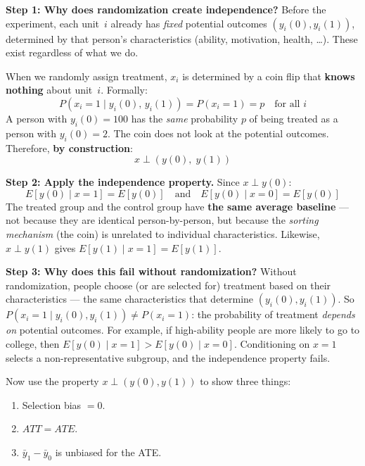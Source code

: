 \documentclass[11pt,a4paper]{article}
\begin{document}
\begin{enumerate}[label=(\alph*)]
\begin{bookexample}
\smallskip
\textbf{Step 1: Why does randomization create independence?} Before the experiment, each unit~$i$ already has \emph{fixed} potential outcomes $(y_i(0), y_i(1))$, determined by that person's characteristics (ability, motivation, health, \dots). These exist regardless of what we do.

When we randomly assign treatment, $x_i$ is determined by a coin flip that \textbf{knows nothing} about unit~$i$. Formally:
\[
  P(x_i = 1 \mid y_i(0),\, y_i(1)) = P(x_i = 1) = p \quad \text{for all } i
\]
A person with $y_i(0) = 100$ has the \emph{same} probability $p$ of being treated as a person with $y_i(0) = 2$. The coin does not look at the potential outcomes. Therefore, \textbf{by construction}:
\[
  \boxed{x \perp (y(0),\; y(1))}
\]

\smallskip
\textbf{Step 2: Apply the independence property.} Since $x \perp y(0)$:
\[
  E[y(0) \mid x{=}1] = E[y(0)] \quad\text{and}\quad E[y(0) \mid x{=}0] = E[y(0)]
\]
The treated group and the control group have \textbf{the same average baseline} --- not because they are identical person-by-person, but because the \emph{sorting mechanism} (the coin) is unrelated to individual characteristics. Likewise, $x \perp y(1)$ gives $E[y(1) \mid x{=}1] = E[y(1)]$.

\smallskip
\textbf{Step 3: Why does this fail without randomization?} Without randomization, people choose (or are selected for) treatment based on their characteristics --- the same characteristics that determine $(y_i(0), y_i(1))$. So $P(x_i = 1 \mid y_i(0), y_i(1)) \neq P(x_i = 1)$: the probability of treatment \emph{depends on} potential outcomes. For example, if high-ability people are more likely to go to college, then $E[y(0) \mid x{=}1] > E[y(0) \mid x{=}0]$. Conditioning on $x = 1$ selects a non-representative subgroup, and the independence property fails.
\end{bookexample}

Now use the property $x \perp (y(0), y(1))$ to show three things:
\begin{enumerate}[label=(\roman*)]
  \item Selection bias $= 0$.
  \item $ATT = ATE$.
  \item $\bar{y}_1 - \bar{y}_0$ is unbiased for the ATE.
\end{enumerate}

\begin{answerbox}
\vspace{7cm}
\end{answerbox}


\end{enumerate}
\end{document}
